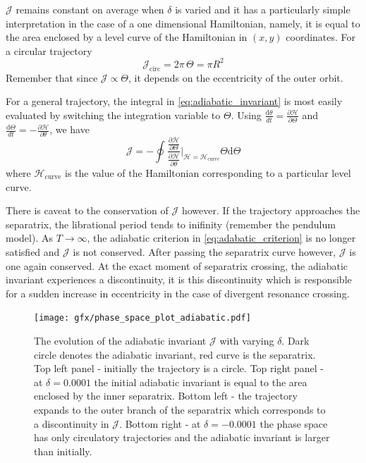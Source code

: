 \documentclass[ twoside,openright,titlepage,numbers=noenddot,headinclude,%
                footinclude=true,cleardoublepage=empty,abstractoff, %
                BCOR=5mm,paper=a4,fontsize=11pt,%
                american,%
                ]{scrreprt}
\begin{document}
$\mathcal{J}$
remains constant on average when $\delta$ is varied and it has a 
particularly simple interpretation in the case of a one dimensional
Hamiltonian, namely, it is equal to the area enclosed by a level
curve of the Hamiltonian in $(x,y)$ coordinates. For a circular trajectory
\begin{equation}
    \mathcal{J}_\text{circ}=2\pi\,\Theta=\pi R^2
    \label{eq:J_circular}
\end{equation}
Remember that since $\mathcal{J}\propto\Theta$, it depends on the 
eccentricity of the outer orbit. 

For a general trajectory, the integral in \cref{eq:adiabatic_invariant}
is most easily evaluated by switching the integration variable to $\Theta$.
Using $\frac{\mathrm{d}\theta}{dt}=\frac{\partial\mathcal{H}}{\partial\Theta}$
and $ \frac{\mathrm{d}\Theta}{dt} =- \frac{\partial\mathcal{H}}{\partial\theta}$,
we have 
\begin{equation}
    \mathcal{J}=-\oint \frac{\frac{\partial\mathcal{H}}{\partial\Theta}}{
        \frac{\partial\mathcal{H}}{\partial\theta}}
    \bigg\rvert_{\mathcal{H}=\mathcal{H}_\text{curve}}\Theta\mathrm{d}\Theta 
\end{equation}
where $\mathcal{H}_\text{curve}$ is the value of the Hamiltonian corresponding
to a particular level curve.

There is caveat to the conservation of $\mathcal{J}$ however. If the trajectory 
approaches
the separatrix, the librational period tends to inifinity (remember the pendulum
model). As $T\rightarrow\infty$, the adiabatic criterion in 
\cref{eq:adabatic_criterion} is no longer satisfied and $\mathcal{J}$ is not
conserved. After passing the separatrix curve however, $\mathcal{J}$ is 
one again conserved. At the exact moment of separatrix crossing, the 
adiabatic invariant experiences a discontinuity, it is this discontinuity
which is responsible for a sudden increase in eccentricity in the case
of divergent resonance crossing.
\begin{figure}[htb]
\centering
\texttt{[image: gfx/phase\_space\_plot\_adiabatic.pdf]}
    \caption{The evolution of the adiabatic invariant $\mathcal{J}$
    with varying $\delta$.
    Dark circle denotes the adiabatic invariant, red curve is the 
    separatrix. Top left panel - initially the trajectory is a circle.
    Top right panel - at $\delta=0.0001$ the initial adiabatic invariant
    is equal to the area enclosed by the inner separatrix. Bottom left
    - the trajectory expands to the outer branch of the separatrix which
    corresponds to a discontinuity in $\mathcal{J}$. Bottom right -
    at $\delta=-0.0001$ the phase space has only circulatory trajectories
    and the adiabatic invariant is larger than initially.}
\label{fig:phase_space_adiabatic}
\end{figure}
\end{document}
